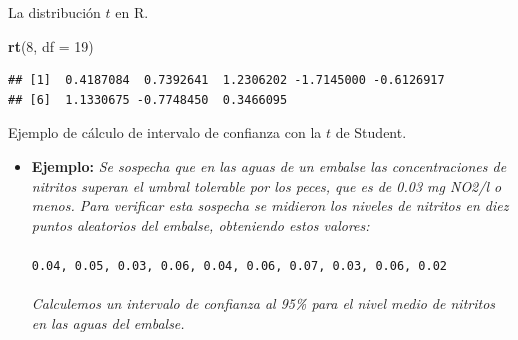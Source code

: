 \documentclass[
  9pt,
  ignorenonframetext,
]{beamer}
\newenvironment{Shaded}{\begin{snugshade}}{\end{snugshade}}
\newcommand{\DataTypeTok}[1]{\textcolor[rgb]{0.13,0.29,0.53}{#1}}
\newcommand{\DecValTok}[1]{\textcolor[rgb]{0.00,0.00,0.81}{#1}}
\newcommand{\KeywordTok}[1]{\textcolor[rgb]{0.13,0.29,0.53}{\textbf{#1}}}
\newcommand{\NormalTok}[1]{#1}
\begin{document}
\begin{frame}[fragile]{La distribución \(t\) en R.}
\begin{itemize}
\begin{Shaded}
\begin{Highlighting}[]
\KeywordTok{rt}\NormalTok{(}\DecValTok{8}\NormalTok{, }\DataTypeTok{df =} \DecValTok{19}\NormalTok{)}
\end{Highlighting}
\end{Shaded}

\begin{verbatim}
## [1]  0.4187084  0.7392641  1.2306202 -1.7145000 -0.6126917
## [6]  1.1330675 -0.7748450  0.3466095
\end{verbatim}

  \normalsize
\end{itemize}

\end{frame}

\begin{frame}[fragile]{Ejemplo de cálculo de intervalo de confianza con
la \(t\) de Student.}
\protect\hypertarget{ejemplo-de-calculo-de-intervalo-de-confianza-con-la-t-de-student.}{}

\begin{itemize}
\item
  \textbf{Ejemplo:} \emph{Se sospecha que en las aguas de un embalse las
  concentraciones de nitritos superan el umbral tolerable por los peces,
  que es de 0.03 mg NO2/l o menos. Para verificar esta sospecha se
  midieron los niveles de nitritos en diez puntos aleatorios del
  embalse, obteniendo estos valores:}\\
  \(\quad\)\\
  \texttt{0.04,\ 0.05,\ 0.03,\ 0.06,\ 0.04,\ 0.06,\ 0.07,\ 0.03,\ 0.06,\ 0.02}~\\
  \(\quad\)\\
  \emph{Calculemos un intervalo de confianza al 95\% para el nivel medio
  de nitritos en las aguas del embalse. }\scriptsize   \(\quad\)


\end{itemize}
\end{frame}
\end{document}
